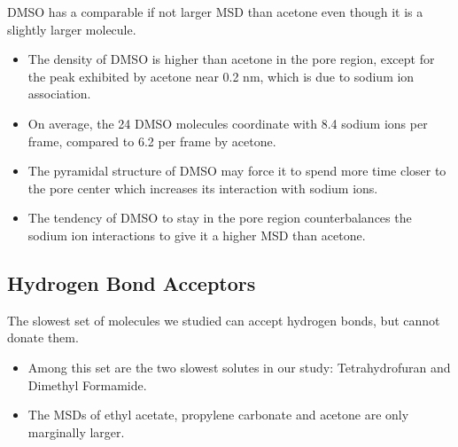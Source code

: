 \documentclass{article}
\begin{document}
  \noindent DMSO has a comparable if not larger MSD than acetone even though it
  is a slightly larger molecule.
  \begin{itemize}
    \item The density of DMSO is higher than acetone in the pore region,
    except for the peak exhibited by acetone near 0.2 nm, which is due to 
    sodium ion association.
    \item On average, the 24 DMSO molecules coordinate with 8.4 sodium ions 
    per frame, compared to 6.2 per frame by acetone.
  	\item The pyramidal structure of DMSO may force it to spend more time closer to
  	the pore center which increases its interaction with sodium ions.
  	\item The tendency of DMSO to stay in the pore region counterbalances the
  	sodium ion interactions to give it a higher MSD than acetone. 
  \end{itemize}  
  
  \subsection*{Hydrogen Bond Acceptors}  %

  The slowest set of molecules we studied can accept hydrogen bonds, but cannot donate
  them. 
  \begin{itemize}
  	\item Among this set are the two slowest solutes in our study: Tetrahydrofuran and Dimethyl Formamide.
  	\item The MSDs of ethyl acetate, propylene carbonate and acetone are only marginally larger.
  \end{itemize}  
  
  
\end{document}
